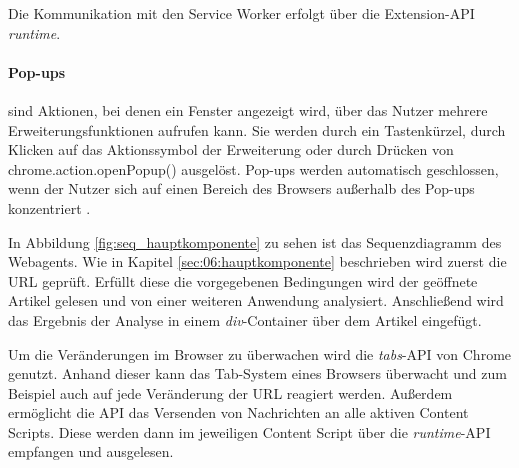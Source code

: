 Die Kommunikation mit den Service Worker erfolgt über die Extension-API \textit{runtime}.

\paragraph{Pop-ups} sind Aktionen, bei denen ein Fenster angezeigt wird, über das Nutzer mehrere Erweiterungsfunktionen aufrufen kann. 
Sie werden durch ein Tastenkürzel, durch Klicken auf das Aktionssymbol der Erweiterung oder durch Drücken von chrome.action.openPopup() ausgelöst. 
Pop-ups werden automatisch geschlossen, wenn der Nutzer sich auf einen Bereich des Browsers außerhalb des Pop-ups konzentriert \cite{chrome2025popups}.

In Abbildung \ref{fig:seq_hauptkomponente} zu sehen ist das Sequenzdiagramm des Webagents. Wie in Kapitel \ref{sec:06:hauptkomponente} beschrieben
wird zuerst die URL geprüft. Erfüllt diese die vorgegebenen Bedingungen wird der geöffnete Artikel gelesen und von einer weiteren Anwendung
analysiert. Anschließend wird das Ergebnis der Analyse in einem \textit{div}-Container über dem Artikel eingefügt.

Um die Veränderungen im Browser zu überwachen wird die \textit{tabs}-API von Chrome genutzt. Anhand dieser kann das Tab-System eines Browsers überwacht
und zum Beispiel auch auf jede Veränderung der URL reagiert werden.
Außerdem ermöglicht die API das Versenden von Nachrichten an alle aktiven Content Scripts. Diese werden dann im jeweiligen Content Script über die
\textit{runtime}-API empfangen und ausgelesen.


